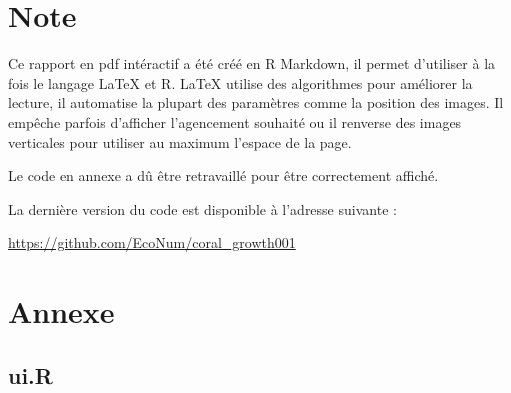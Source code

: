 \documentclass[]{report}
\begin{document}
\chapter{Note}\label{note}

Ce rapport en pdf intéractif a été créé en R Markdown, il permet
d'utiliser à la fois le langage LaTeX et R. LaTeX utilise des
algorithmes pour améliorer la lecture, il automatise la plupart des
paramètres comme la position des images. Il empêche parfois d'afficher
l'agencement souhaité ou il renverse des images verticales pour utiliser
au maximum l'espace de la page.

Le code en annexe a dû être retravaillé pour être correctement affiché.

La dernière version du code est disponible à l'adresse suivante :

\url{https://github.com/EcoNum/coral_growth001}

\chapter{Annexe}\label{annexe}

\section{ui.R}\label{ui.r}
\end{document}
